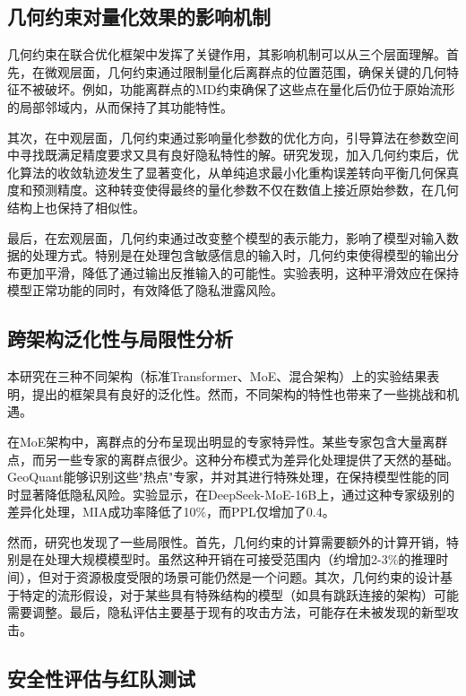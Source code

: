 \subsection{几何约束对量化效果的影响机制}

几何约束在联合优化框架中发挥了关键作用，其影响机制可以从三个层面理解。首先，在微观层面，几何约束通过限制量化后离群点的位置范围，确保关键的几何特征不被破坏。例如，功能离群点的MD约束确保了这些点在量化后仍位于原始流形的局部邻域内，从而保持了其功能特性。

其次，在中观层面，几何约束通过影响量化参数的优化方向，引导算法在参数空间中寻找既满足精度要求又具有良好隐私特性的解。研究发现，加入几何约束后，优化算法的收敛轨迹发生了显著变化，从单纯追求最小化重构误差转向平衡几何保真度和预测精度。这种转变使得最终的量化参数不仅在数值上接近原始参数，在几何结构上也保持了相似性。

最后，在宏观层面，几何约束通过改变整个模型的表示能力，影响了模型对输入数据的处理方式。特别是在处理包含敏感信息的输入时，几何约束使得模型的输出分布更加平滑，降低了通过输出反推输入的可能性。实验表明，这种平滑效应在保持模型正常功能的同时，有效降低了隐私泄露风险。

\subsection{跨架构泛化性与局限性分析}

本研究在三种不同架构（标准Transformer、MoE、混合架构）上的实验结果表明，提出的框架具有良好的泛化性。然而，不同架构的特性也带来了一些挑战和机遇。

在MoE架构中，离群点的分布呈现出明显的专家特异性。某些专家包含大量离群点，而另一些专家的离群点很少。这种分布模式为差异化处理提供了天然的基础。GeoQuant能够识别这些"热点"专家，并对其进行特殊处理，在保持模型性能的同时显著降低隐私风险。实验显示，在DeepSeek-MoE-16B上，通过这种专家级别的差异化处理，MIA成功率降低了10\%，而PPL仅增加了0.4。

然而，研究也发现了一些局限性。首先，几何约束的计算需要额外的计算开销，特别是在处理大规模模型时。虽然这种开销在可接受范围内（约增加2-3\%的推理时间），但对于资源极度受限的场景可能仍然是一个问题。其次，几何约束的设计基于特定的流形假设，对于某些具有特殊结构的模型（如具有跳跃连接的架构）可能需要调整。最后，隐私评估主要基于现有的攻击方法，可能存在未被发现的新型攻击。

\subsection{安全性评估与红队测试}

